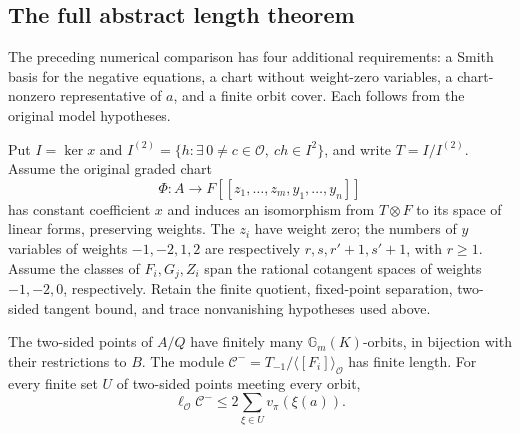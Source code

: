 \subsection{The full abstract length theorem}
\label{subsec:selmer-core-wrapper}

The preceding numerical comparison has four additional requirements:
a Smith basis for the negative equations, a chart without weight-zero
variables, a chart-nonzero representative of $a$, and a finite orbit
cover. Each follows from the original model hypotheses.

Put $I=\ker x$ and
$I^{(2)}=\{h:\exists\,0\ne c\in\mathcal O,\ ch\in I^2\}$, and
write $T=I/I^{(2)}$. Assume the original graded chart
\[
 \Phi:A\longrightarrow F[[z_1,\ldots,z_m,y_1,\ldots,y_n]]
\]
has constant coefficient $x$ and induces an isomorphism from
$T\otimes F$ to its space of linear forms, preserving weights.
The $z_i$ have weight zero; the numbers of $y$ variables of weights
$-1,-2,1,2$ are respectively $r,s,r'+1,s'+1$, with $r\ge1$.
Assume the classes of $F_i,G_j,Z_i$ span the rational cotangent
spaces of weights $-1,-2,0$, respectively. Retain the finite quotient,
fixed-point separation, two-sided tangent bound, and trace
nonvanishing hypotheses used above.

\begin{theorem}
\label{thm:selmer-abstract-length}
The two-sided points of $A/Q$ have finitely many
$\mathbb G_m(K)$-orbits, in bijection with their restrictions to $B$.
The module
$\mathcal C^-=T_{-1}/\langle[F_i]\rangle_{\mathcal O}$ has finite
length. For every finite set $U$ of two-sided points meeting every
orbit,
\[
 \ell_{\mathcal O}\mathcal C^-
 \le2\sum_{\xi\in U}v_\pi(\xi(a)).
\]
\end{theorem}

